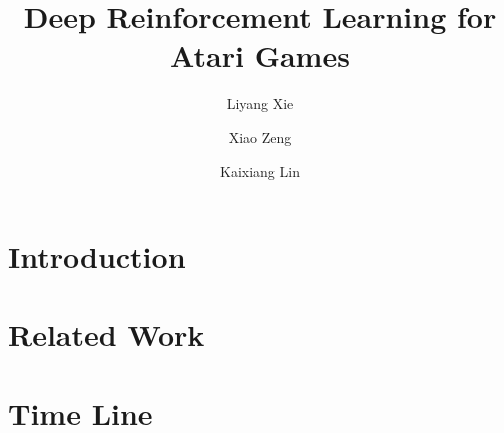 \documentclass[10pt,twocolumn,letterpaper]{article}
\begin{document}
\title{Deep Reinforcement Learning for Atari Games}

\author{Liyang Xie \and Xiao Zeng \and Kaixiang Lin\\}

\maketitle


\begin{abstract}

\end{abstract}

\section{Introduction}




\section{Related Work}




% 



\section{Time Line}






{\small


}
\end{document}
